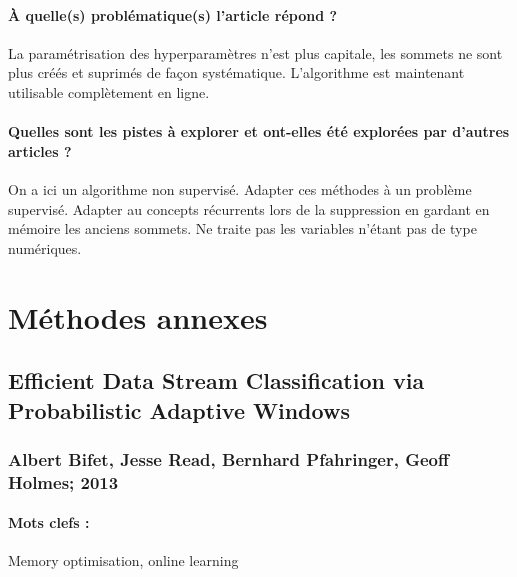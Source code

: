 \documentclass[11pt,a4paper]{report}
\begin{document}
\paragraph{À quelle(s) problématique(s) l'article répond ? } La paramétrisation des hyperparamètres n'est plus capitale, les sommets ne sont plus créés et suprimés de façon systématique. L'algorithme est maintenant utilisable complètement en ligne.

\paragraph{Quelles sont les pistes à explorer et ont-elles  été explorées par d'autres articles ? } On a ici un algorithme non supervisé. Adapter ces méthodes à un problème supervisé. Adapter au concepts récurrents lors de la suppression en gardant en mémoire les anciens sommets. Ne traite pas les variables n'étant pas de type numériques.





\section{Méthodes annexes}

\subsection{Efficient Data Stream Classification via Probabilistic Adaptive Windows}
\subsubsection{Albert Bifet, Jesse Read, Bernhard Pfahringer, Geoff Holmes; 2013}

\paragraph{Mots clefs :}Memory optimisation, online learning 
\end{document}
